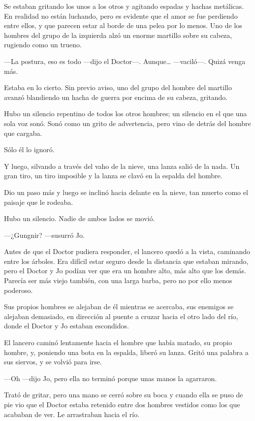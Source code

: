 Se estaban gritando los unos a los otros y agitando espadas y hachas
metálicas. En realidad no están luchando, pero es evidente que el amor
se fue perdiendo entre ellos, y que parecen estar al borde de una pelea
por lo menos. Uno de los hombres del grupo de la izquierda alzó un
enorme martillo sobre su cabeza, rugiendo como un trueno.

---La postura, eso es todo ---dijo el Doctor---. Aunque\ldots{}
---vaciló---. Quizá venga más.

Estaba en lo cierto. Sin previo aviso, uno del grupo del hombre del
martillo avanzó blandiendo un hacha de guerra por encima de su cabeza,
gritando.

Hubo un silencio repentino de todos los otros hombres; un silencio en el
que una sola voz sonó. Sonó como un grito de advertencia, pero vino de
detrás del hombre que cargaba.

Sólo él lo ignoró.

Y luego, silvando a través del vaho de la nieve, una lanza salió de la
nada. Un gran tiro, un tiro imposible y la lanza se clavó en la espalda
del hombre.

Dio un paso más y luego se inclinó hacia delante en la nieve, tan muerto
como el paisaje que le rodeaba.

Hubo un silencio. Nadie de ambos lados se movió.

---¿Gungnir? ---susurró Jo.

Antes de que el Doctor pudiera responder, el lancero quedó a la vista,
caminando entre los árboles. Era difícil estar seguro desde la distancia
que estaban mirando, pero el Doctor y Jo podían ver que era un hombre
alto, más alto que los demás. Parecía ser más viejo también, con una
larga barba, pero no por ello menos poderoso.

Sus propios hombres se alejaban de él mientras se acercaba, sus enemigos
se alejaban demasiado, en dirección al puente a cruzar hacia el otro
lado del río, donde el Doctor y Jo estaban escondidos.

El lancero caminó lentamente hacia el hombre que había matado, su propio
hombre, y, poniendo una bota en la espalda, liberó su lanza. Gritó una
palabra a sus siervos, y se volvió para irse.

---Oh ---dijo Jo, pero ella no terminó porque unas manos la agarraron.

Trató de gritar, pero una mano se cerró sobre su boca y cuando ella se
puso de pie vio que el Doctor estaba retenido entre dos hombres vestidos
como los que acababan de ver. Le arrastraban hacia el río.

